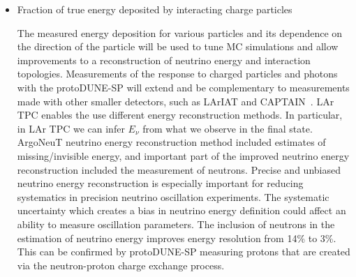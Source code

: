 \begin{itemize}
The PID efficiency and purity depend on a number of factors, such as the detector configuration, geometry and reconstruction algorithms. PID results on data, especially for pion/muon separation, may be significantly different if e.g. electronics noise assumed in the detector response simulation is not reproducing features of the DUNE readout chain or if signal processing and reconstruction algorithms are updated. It is, therefore, important to test entire PID scheme in a prototype detector data, using the presence of all detector effects to improve models used in both simulation and reconstruction. Event samples that include an adequate number of stopping particles for each species
(muon, pions, protons and kaons) are included in the particle summary request to perform tests of PID algorithms and Bethe-Bloch calibration measurements.

\begin{cdrfigure}{resrange}{ProtoDUNE-SP Simulated track $dQ/dx$ as a function of residual range for muons, pions, protons and kaons, used as training data in a neutral-net-based PID algorithm (left). Distribution of $dQ/dx$ for each particle type for a bin with residual range 
6($\pm$1)~cm (right). The small difference between muon and pion PID is illustrated.}
\texttt{[image: dEdxprmupi]}
\texttt{[image: dEdxprmupienbin]}
\end{cdrfigure}


\item Fraction of true energy deposited by interacting charge particles 


The measured energy deposition for various particles and its dependence on the direction of the particle will be used to tune
MC simulations and allow improvements to a reconstruction of neutrino energy and interaction topologies. %
Measurements of the response to charged particles and
photons with the protoDUNE-SP will extend and be complementary to
measurements made with other smaller detectors, such as LArIAT \cite{lariat}
and CAPTAIN~\cite{captain}.
 LAr TPC enables the use different energy reconstruction methods. In particular, in LAr TPC we can infer $E_\nu$ from what we observe in the final state. ArgoNeuT neutrino energy reconstruction method included estimates of missing/invisible energy, and important part of the improved neutrino energy reconstruction included the measurement of neutrons. Precise and unbiased neutrino energy reconstruction is especially important for reducing systematics in precision neutrino oscillation experiments. The systematic uncertainty which creates a bias in neutrino energy definition could affect an ability to measure oscillation parameters.  The inclusion of neutrons in the estimation of neutrino energy improves energy resolution from 14\% to 3\%.  This can be confirmed by protoDUNE-SP measuring protons that are created via the neutron-proton charge exchange process.
\end{itemize}


